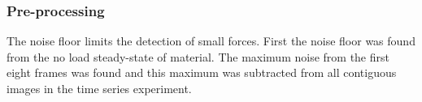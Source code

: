 \subsubsection{Pre-processing}\label{Pre-processing2}
The noise floor limits the detection of small forces. First the noise floor was found from the no load steady-state of material. The maximum noise from the first eight frames was found and this maximum was subtracted from all contiguous images in the time series experiment.

